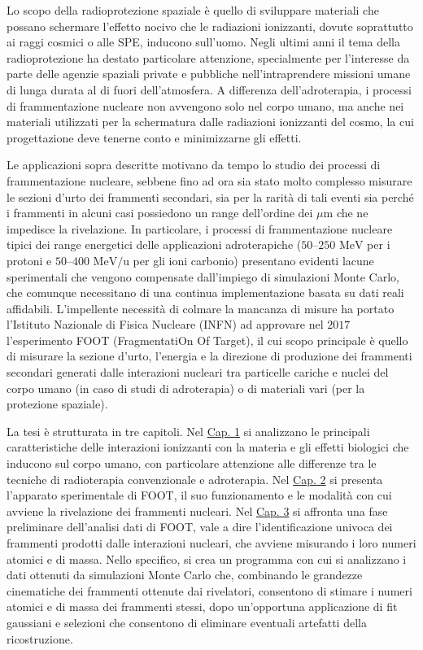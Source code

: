 \documentclass[12pt,a4paper,twoside]{report}
\begin{document}
	Lo scopo della radioprotezione spaziale è quello di sviluppare materiali che possano schermare l'effetto nocivo che le radiazioni ionizzanti, dovute soprattutto ai raggi cosmici o alle SPE, inducono sull'uomo. Negli ultimi anni il tema della radioprotezione ha destato particolare attenzione, specialmente per l'interesse da parte delle agenzie spaziali private e pubbliche nell'intraprendere missioni umane di lunga durata al di fuori dell'atmosfera. A differenza dell'adroterapia, i processi di frammentazione nucleare non avvengono solo nel corpo umano, ma anche nei materiali utilizzati per la schermatura dalle radiazioni ionizzanti del cosmo, la cui progettazione deve tenerne conto e minimizzarne gli effetti.
	
	Le applicazioni sopra descritte motivano da tempo lo studio dei processi di frammentazione nucleare, sebbene fino ad ora sia stato molto complesso misurare le sezioni d'urto dei frammenti secondari, sia per la rarità di tali eventi sia perché i frammenti in alcuni casi possiedono un range dell'ordine dei $\mu\mbox{m}$ che ne impedisce la rivelazione. In particolare, i processi di frammentazione nucleare tipici dei range energetici delle applicazioni adroterapiche ($50$--$250\mbox{ MeV}$ per i protoni e $50$--$400\mbox{ MeV/u}$ per gli ioni carbonio) presentano evidenti lacune sperimentali che vengono compensate dall'impiego di simulazioni Monte Carlo, che comunque necessitano di una continua implementazione basata su dati reali affidabili. L'impellente necessità di colmare la mancanza di misure ha portato l'Istituto Nazionale di Fisica Nucleare (INFN) ad approvare nel $2017$ l'esperimento FOOT (FragmentatiOn Of Target), il cui scopo principale è quello di misurare la sezione d'urto, l'energia e la direzione di produzione dei frammenti secondari generati dalle interazioni nucleari tra particelle cariche e nuclei del corpo umano (in caso di studi di adroterapia) o di materiali vari (per la protezione spaziale).
	
	La tesi è strutturata in tre capitoli. Nel \hyperref[cap:1]{Cap. 1} si analizzano le principali caratteristiche delle interazioni ionizzanti con la materia e gli effetti biologici che inducono sul corpo umano, con particolare attenzione alle differenze tra le tecniche di radioterapia convenzionale e adroterapia. Nel \hyperref[cap:2]{Cap. 2} si presenta l'apparato sperimentale di FOOT, il suo funzionamento e le modalità con cui avviene la rivelazione dei frammenti nucleari. Nel \hyperref[cap:3]{Cap. 3} si affronta una fase preliminare dell'analisi dati di FOOT, vale a dire l'identificazione univoca dei frammenti prodotti dalle interazioni nucleari, che avviene misurando i loro numeri atomici e di massa. Nello specifico, si crea un programma con cui si analizzano i dati ottenuti da simulazioni Monte Carlo che, combinando le grandezze cinematiche dei frammenti ottenute dai rivelatori, consentono di stimare i numeri atomici e di massa dei frammenti stessi, dopo un'opportuna applicazione di fit gaussiani e selezioni che consentono di eliminare eventuali artefatti della ricostruzione.
	\newpage
\end{document}
